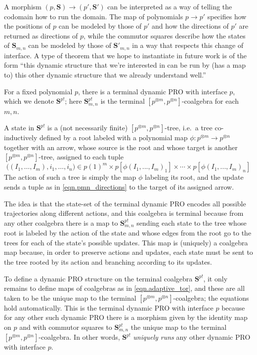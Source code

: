 \documentclass[11pt, one side, article]{memoir}
\theoremstyle{definition}
\theoremstyle{plain}
\newenvironment{example}
  {\pushQED{\qed}\renewcommand{\qedsymbol}{$\lozenge$}\examplex}
  {\popQED\endexamplex}
\newcommand{\Cat}[1]{\mathbf{#1}}%
\newcommand{\0}{\textsf{0}}
\newcommand{\1}{\tn{\textsf{1}}}
\renewcommand{\S}{{\Cat{S}}}
\begin{document}
A morphism $(p,\S) \to (p',\S')$ can be interpreted as a way of telling the codomain how to run the domain. The map of polynomials $p \to p'$ specifies how the positions of $p$ can be modeled by those of $p'$ and how the directions of $p'$ are returned as directions of $p$, while the commutor squares describe how the states of $\S_{m,n}$ can be modeled by those of $\S'_{m,n}$ in a way that respects this change of interface. A type of theorem that we hope to instantiate in future work is of the form ``this dynamic structure that we're interested in can be run by (has a map to) this other dynamic structure that we already understand well.''

\begin{example}
For a fixed polynomial $p$, there is a terminal dynamic PRO with interface $p$, which we denote $\S^{p!}$; here $\S^{p!}_{m,n}$ is the terminal $[p^{\otimes m},p^{\otimes n}]$-coalgebra for each $m,n$. 

A state in $\S^{p!}$ is a (not necessarily finite) $[p^{\otimes m},p^{\otimes n}]$-tree, i.e.\ a tree co-inductively defined by a root labeled with a polynomial map $\phi\colon p^{\otimes m} \to p^{\otimes n}$ together with an arrow, whose source is the root and whose target is another $[p^{\otimes m},p^{\otimes n}]$-tree, assigned to each tuple 
\begin{equation}\label{eqn.pmn_directions}
\big((I_1,\ldots,I_m), i_1,\ldots,i_n\big) \in  p(1)^m\times p[\phi(I_1,...,I_m)_1] \times \cdots \times p[\phi(I_1,...,I_m)_n]
\end{equation}
The action of such a tree is simply the map $\phi$ labeling its root, and the update sends a tuple as in \eqref{eqn.pmn_directions} to the target of its assigned arrow. 

The idea is that the state-set of the terminal dynamic PRO encodes all possible trajectories along different actions, and this coalgebra is terminal because from any other coalgebra there is a map to $\S^{p!}_{m,n}$ sending each state to the tree whose root is labeled by the action of the state and whose edges from the root go to the trees for each of the state's possible updates. This map is (uniquely) a coalgebra map because, in order to preserve actions and updates, each state must be sent to the tree rooted by its action and branching according to its updates.

To define a dynamic PRO structure on the terminal coalgebra $\S^{p!}$, it only remains to define maps of coalgebras as in \cref{eqn.adaptive_tor}, and these are all taken to be the unique map to the terminal $[p^{\otimes m},p^{\otimes n}]$-coalgebra; the equations hold automatically. This is the terminal dynamic PRO with interface $p$ because for any other such dynamic PRO there is a morphism given by the identity map on $p$ and with commutor squares to $\S^{p!}_{m,n}$ the unique map to the terminal $[p^{\otimes m},p^{\otimes n}]$-coalgebra. In other words, $\S^{p!}$ \emph{uniquely runs} any other dynamic PRO with interface $p$.
\end{example}
\end{document}
